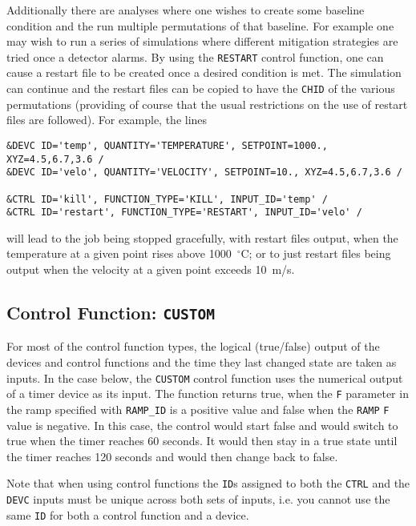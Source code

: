 \documentclass[11pt]{book}
\newcommand{\ct}{\tt\small}
\begin{document}
Additionally there are analyses where one wishes to create some
baseline condition and the run multiple permutations of that baseline.
For example one may wish to run a series of simulations where
different mitigation strategies are tried once a detector alarms.  By
using the {\ct RESTART} 
control function, one can cause a restart file
to be created once a desired condition is met.  The simulation can
continue and the restart files can be copied to have the {\ct CHID} of
the various permutations (providing of course that the usual
restrictions on the use of restart files are followed).
For example, the lines

\footnotesize
\begin{verbatim}
&DEVC ID='temp', QUANTITY='TEMPERATURE', SETPOINT=1000., XYZ=4.5,6.7,3.6 /
&DEVC ID='velo', QUANTITY='VELOCITY', SETPOINT=10., XYZ=4.5,6.7,3.6 /

&CTRL ID='kill', FUNCTION_TYPE='KILL', INPUT_ID='temp' /
&CTRL ID='restart', FUNCTION_TYPE='RESTART', INPUT_ID='velo' /
\end{verbatim} \normalsize

\noindent
will lead to the job being stopped gracefully, with restart files output, when the temperature at a given point rises above
1000~$^\circ$C; or to just restart files being output when the velocity at a given point exceeds 10~m/s.



\subsection{Control Function: \texorpdfstring{{\tt CUSTOM}}{CUSTOM} }

For most of the control function types, the logical (true/false) output of
the devices and control functions and the time they last changed
state are taken as inputs.  In the case below, the {\ct CUSTOM} 
control function uses the numerical output of a timer device as its input.  The function returns true, when the {\ct F} parameter
in the ramp specified with {\ct RAMP\_ID} is a positive value and
false when the {\ct RAMP} {\ct F} value is negative.
In this case, the control would start false and would switch to
true when the timer reaches 60 seconds.  It would then stay in a true
state until the timer reaches 120 seconds and would then change back to false.

\begin{warning}
Note that when using control functions the {\ct ID}s assigned to both the
{\ct CTRL} and the {\ct DEVC} inputs must be unique across both sets of inputs, i.e. you cannot use the
same {\ct ID} for both a control function and a device.
\end{warning}
\end{document}
